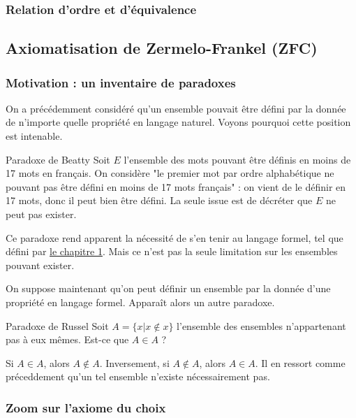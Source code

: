 \subsubsection{Relation d'ordre et d'équivalence}

\subsection{Axiomatisation de Zermelo-Frankel (ZFC)}
\subsubsection{Motivation : un inventaire de paradoxes}
On a précédemment considéré qu'un ensemble pouvait être défini par la donnée de n'importe quelle propriété en langage naturel. Voyons pourquoi cette position est intenable.

\begin{boite}{Paradoxe de Beatty}
	Soit $E$ l'ensemble des mots pouvant être définis en moins de 17 mots en français. On considère "le premier mot par ordre alphabétique ne pouvant pas être défini en moins de 17 mots français" : on vient de le définir en 17 mots, donc il peut bien être défini. La seule issue est de décréter que $E$ ne peut pas exister. 
\end{boite}

Ce paradoxe rend apparent la nécessité de s'en tenir au langage formel, tel que défini par \hyperref[lang]{le chapitre 1}. Mais ce n'est pas la seule limitation sur les ensembles pouvant exister.

On suppose maintenant qu'on peut définir un ensemble par la donnée d'une propriété en langage formel. Apparaît alors un autre paradoxe.

\begin{boite}{Paradoxe de Russel}
	Soit $A=\{x|x\not\in x\}$ l'ensemble des ensembles n'appartenant pas à eux mêmes. Est-ce que $A\in A$ ?

	Si $A\in A$, alors $A\not \in A$. Inversement, si $A \not\in A$, alors $A\in A$. Il en ressort comme préceddement qu'un tel ensemble n'existe nécessairement pas. 
\end{boite}



\subsubsection{Zoom sur l'axiome du choix}

